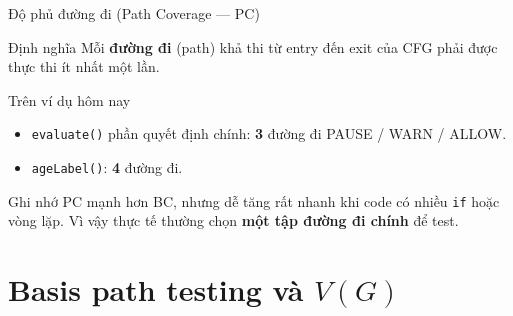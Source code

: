 \documentclass[aspectratio=169,12pt]{beamer}
\begin{document}
\begin{frame}{Độ phủ đường đi (Path Coverage --- PC)}
  \begin{block}{Định nghĩa}
    Mỗi \textbf{đường đi} (path) khả thi từ entry đến exit của CFG
    phải được thực thi ít nhất một lần.
  \end{block}

  \vspace{0.2em}
  \begin{exampleblock}{Trên ví dụ hôm nay}
    \begin{itemize}
      \item \texttt{evaluate()} phần quyết định chính: \textbf{3} đường đi
        PAUSE / WARN / ALLOW.
      \item \texttt{ageLabel()}: \textbf{4} đường đi.
    \end{itemize}
  \end{exampleblock}

  \vspace{0.2em}
  \begin{alertblock}{Ghi nhớ}
    PC mạnh hơn BC, nhưng dễ tăng rất nhanh khi code có nhiều \texttt{if}
    hoặc vòng lặp. Vì vậy thực tế thường chọn \textbf{một tập đường đi chính}
    để test.
  \end{alertblock}
\end{frame}


\section{Basis path testing và \texorpdfstring{$V(G)$}{V(G)}}
\end{document}
